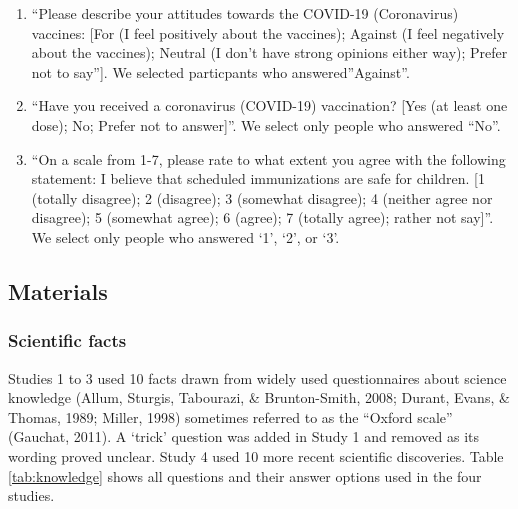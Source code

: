 \documentclass[
  doc,floatsintext]{apa6}
\providecommand{\tightlist}{%
  \setlength{\itemsep}{0pt}\setlength{\parskip}{0pt}}
\begin{document}
\begin{enumerate}
\def\labelenumi{\arabic{enumi}.}
\tightlist
\item
  ``Please describe your attitudes towards the COVID-19 (Coronavirus) vaccines: {[}For (I feel positively about the vaccines); Against (I feel negatively about the vaccines); Neutral (I don't have strong opinions either way); Prefer not to say''{]}. We selected particpants who answered''Against''.
\item
  ``Have you received a coronavirus (COVID-19) vaccination? {[}Yes (at least one dose); No; Prefer not to answer{]}''. We select only people who answered ``No''.
\item
  ``On a scale from 1-7, please rate to what extent you agree with the following statement: I believe that scheduled immunizations are safe for children. {[}1 (totally disagree); 2 (disagree); 3 (somewhat disagree); 4 (neither agree nor disagree); 5 (somewhat agree); 6 (agree); 7 (totally agree); rather not say{]}''. We select only people who answered `1', `2', or `3'.
\end{enumerate}

\subsection{Materials}\label{materials-1}

\subsubsection{Scientific facts}\label{scientific-facts}

Studies 1 to 3 used 10 facts drawn from widely used questionnaires about science knowledge (Allum, Sturgis, Tabourazi, \& Brunton-Smith, 2008; Durant, Evans, \& Thomas, 1989; Miller, 1998) sometimes referred to as the ``Oxford scale'' (Gauchat, 2011). A `trick' question was added in Study 1 and removed as its wording proved unclear. Study 4 used 10 more recent scientific discoveries. Table \ref{tab:knowledge} shows all questions and their answer options used in the four studies.

\begingroup\fontsize{8}{10}\selectfont
\end{document}
